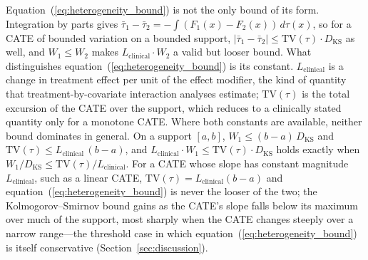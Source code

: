 \documentclass[AMA,Times1COL]{WileyNJDv5}
\begin{document}
\noindent Equation~(\ref{eq:heterogeneity_bound}) is not the only bound of its form. Integration by parts gives $\bar{\tau}_1 - \bar{\tau}_2 = -\int (F_1(x) - F_2(x)) \, d\tau(x)$, so for a CATE of bounded variation on a bounded support, $|\bar{\tau}_1 - \bar{\tau}_2| \leq \mathrm{TV}(\tau) \cdot D_{\text{KS}}$ as well, and $W_1 \leq W_2$ makes $L_{\text{clinical}} \cdot W_2$ a valid but looser bound.\cite{villani2009} What distinguishes equation~(\ref{eq:heterogeneity_bound}) is its constant. $L_{\text{clinical}}$ is a change in treatment effect per unit of the effect modifier, the kind of quantity that treatment-by-covariate interaction analyses estimate; $\mathrm{TV}(\tau)$ is the total excursion of the CATE over the support, which reduces to a clinically stated quantity only for a monotone CATE. Where both constants are available, neither bound dominates in general. On a support $[a, b]$, $W_1 \leq (b - a)\,D_{\text{KS}}$ and $\mathrm{TV}(\tau) \leq L_{\text{clinical}}\,(b - a)$, and $L_{\text{clinical}} \cdot W_1 \leq \mathrm{TV}(\tau) \cdot D_{\text{KS}}$ holds exactly when $W_1 / D_{\text{KS}} \leq \mathrm{TV}(\tau) / L_{\text{clinical}}$. For a CATE whose slope has constant magnitude $L_{\text{clinical}}$, such as a linear CATE, $\mathrm{TV}(\tau) = L_{\text{clinical}}(b - a)$ and equation~(\ref{eq:heterogeneity_bound}) is never the looser of the two; the Kolmogorov--Smirnov bound gains as the CATE's slope falls below its maximum over much of the support, most sharply when the CATE changes steeply over a narrow range---the threshold case in which equation~(\ref{eq:heterogeneity_bound}) is itself conservative (Section~\ref{sec:discussion}).
\end{document}
